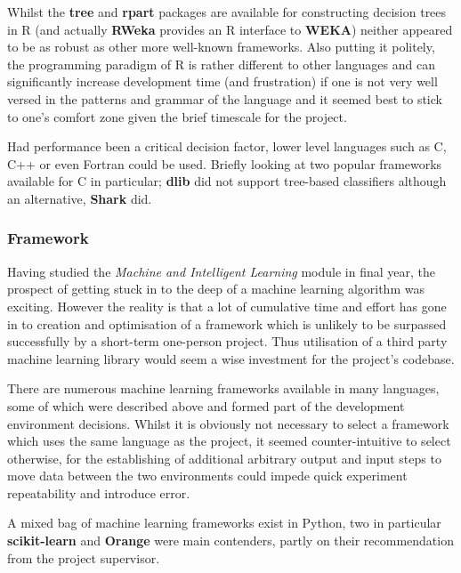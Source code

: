 Whilst the \textbf{tree}\citep{man:rtree} and \textbf{rpart}\citep{man:rpart}
packages are available for constructing decision trees in R (and actually
\textbf{RWeka} provides an R interface to \textbf{WEKA}) neither appeared to be
as robust as other more well-known frameworks. Also putting it politely, the
programming paradigm of R\citep{man:R} is rather different to other languages
and can significantly increase development time (and frustration\citep{argh}) if
one is not very well versed in the patterns and grammar of the language  and it
seemed best to stick to one's comfort zone given the brief timescale for the
project.

Had performance been a critical decision factor, lower level languages such as
C, C++ or even Fortran could be used. Briefly looking at two popular frameworks
available for C in particular; \textbf{dlib} did not support tree-based
classifiers although an alternative, \textbf{Shark} did.


\subsubsection{Framework}

Having studied the \textit{Machine and Intelligent Learning} module in final
year, the prospect of getting stuck in to the deep of a machine learning
algorithm was exciting. However the reality is that a lot of cumulative time and
effort has gone in to creation and optimisation of a framework which is unlikely
to be surpassed successfully by a short-term one-person project. Thus
utilisation of a third party machine learning library would seem a wise
investment for the project's codebase.

There are numerous machine learning frameworks available in many languages, some
of which were described above and formed part of the development environment
decisions. Whilst it is obviously not necessary to select a framework which uses
the same language as the project, it seemed counter-intuitive to select otherwise,
for the establishing of additional arbitrary output and input steps to move data
between the two environments could impede quick experiment repeatability and
introduce error.

A mixed bag of machine learning frameworks exist in Python, two in particular
\textbf{scikit-learn}\citep{scikit-learn} and \textbf{Orange}\citep{orange}
were main contenders, partly on their recommendation from the project
supervisor.

